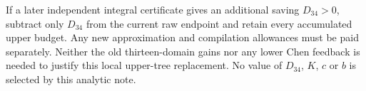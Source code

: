 If a later independent integral certificate gives an additional
saving $D_{34}>0$, subtract only $D_{34}$ from the current raw
endpoint and retain every accumulated upper budget. Any new
approximation and compilation allowances must be paid separately.
Neither the old thirteen-domain gains nor any lower Chen feedback
is needed to justify this local upper-tree replacement. No value
of $D_{34}$, $K$, $c$ or $b$ is selected by this analytic note.
